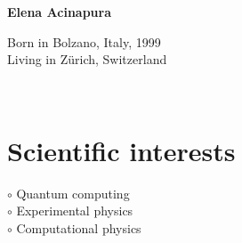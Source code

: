 \documentclass[a4paper,10pt]{article}
\begin{document}
\thispagestyle{empty}

\begin{adjustbox}{valign=t}
\begin{minipage}{0.3\textwidth} %
\begin{center}

\MySkip 	%

{\LARGE \bfseries Elena Acinapura}

\MySkip 	%

Born in Bolzano, Italy, 1999\\
Living in Zürich, Switzerland\\

\MySkip 	%

\textcolor{ColorTwo}{\faEnvelopeO} 
 \\

\textcolor{ColorTwo}{\faChain} 
\end{center}

\vfill

\section*{Scientific interests}
\raggedright
\textcolor{ColorOne}{$\circ$} Quantum computing\\
\textcolor{ColorOne}{$\circ$} Experimental physics\\
\textcolor{ColorOne}{$\circ$} Computational physics\\


\end{minipage}
\end{adjustbox}
\end{document}
